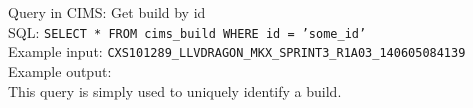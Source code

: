 
\label{q:getbuild}
Query in CIMS: Get build by id \\
SQL: {\tt SELECT * FROM cims\_build WHERE id = 'some\_id'} \\
Example input: {\tt CXS101289\_LLVDRAGON\_MKX\_SPRINT3\_R1A03\_140605084139 } \\
Example output: \\
This query is simply used to uniquely identify a build.

